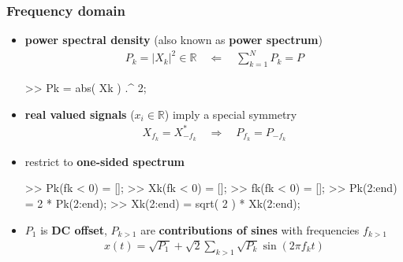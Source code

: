 \begin{frame}[fragile] %
	\frametitle{Frequency domain}
	\begin{itemize}
		\item \textbf{power spectral density} (also known as \textbf{power spectrum})
			\begin{align*}
				P_k=\lvert X_k\rvert^2\in\mathbb R\quad\Leftarrow\quad\sum_{k=1}^NP_k=P
			\end{align*}
			\begin{code}
>> Pk = abs( Xk ) .^ 2; \color{medium}%
			\end{code}
		\item \textbf{real valued signals} ($x_i\in\mathbb R$) imply a special symmetry
			\begin{align*}
				X_{f_k}=X_{-f_k}^*\quad\Rightarrow\quad P_{f_k}=P_{-f_k}
			\end{align*}
		\item restrict to \textbf{one-sided spectrum}
			\begin{code}
>> Pk(fk < 0) = []; \color{medium}%
>> Xk(fk < 0) = [];
>> fk(fk < 0) = [];
>> Pk(2:end) = 2 * Pk(2:end); \color{medium}%
>> Xk(2:end) = sqrt( 2 ) * Xk(2:end);
			\end{code}
		\item $P_1$ is \textbf{DC offset}, $P_{k>1}$ are \textbf{contributions of sines} with frequencies $f_{k>1}$
			\begin{align*}
				x(t)=\sqrt{P_1}+\sqrt2\sum_{k>1}\sqrt{P_k}\sin(2\pi f_kt)
			\end{align*}
	\end{itemize}
\end{frame}

